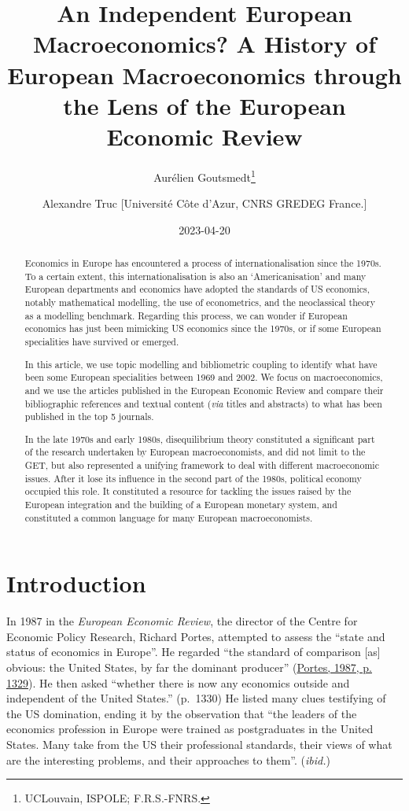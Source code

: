 \documentclass[
]{article}
\title{An Independent European Macroeconomics? A History of European
Macroeconomics through the Lens of the European Economic Review}
\author{Aurélien Goutsmedt\footnote{UCLouvain, ISPOLE; F.R.S.-FNRS.} \and Alexandre
Truc {[}Université Côte d'Azur, CNRS GREDEG France.{]}}
\date{2023-04-20}
\begin{document}
\maketitle
\begin{abstract}
Economics in Europe has encountered a process of internationalisation
since the 1970s. To a certain extent, this internationalisation is also
an `Americanisation' and many European departments and economics have
adopted the standards of US economics, notably mathematical modelling,
the use of econometrics, and the neoclassical theory as a modelling
benchmark. Regarding this process, we can wonder if European economics
has just been mimicking US economics since the 1970s, or if some
European specialities have survived or emerged.

In this article, we use topic modelling and bibliometric coupling to
identify what have been some European specialities between 1969 and
2002. We focus on macroeconomics, and we use the articles published in
the European Economic Review and compare their bibliographic references
and textual content (\emph{via} titles and abstracts) to what has been
published in the top 5 journals.

In the late 1970s and early 1980s, disequilibrium theory constituted a
significant part of the research undertaken by European macroeconomists,
and did not limit to the GET, but also represented a unifying framework
to deal with different macroeconomic issues. After it lose its influence
in the second part of the 1980s, political economy occupied this role.
It constituted a resource for tackling the issues raised by the European
integration and the building of a European monetary system, and
constituted a common language for many European macroeconomists.
\end{abstract}

\hypertarget{introduction}{%
\section{Introduction}\label{introduction}}

In 1987 in the \emph{European Economic Review}, the director of the
Centre for Economic Policy Research, Richard Portes, attempted to assess
the ``state and status of economics in Europe''. He regarded ``the
standard of comparison {[}as{]} obvious: the United States, by far the
dominant producer'' (\protect\hyperlink{ref-portes1987}{Portes, 1987, p.
1329}). He then asked ``whether there is now any economics outside and
independent of the United States.'' (p.~1330) He listed many clues
testifying of the US domination, ending it by the observation that ``the
leaders of the economics profession in Europe were trained as
postgraduates in the United States. Many take from the US their
professional standards, their views of what are the interesting
problems, and their approaches to them''. (\emph{ibid.})
\end{document}
